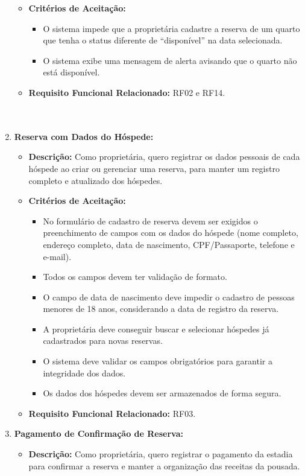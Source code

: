 \documentclass[
	12pt,				%
	openany,			%
	oneside,			%
	a4paper,			%
	english,			%
	french,				%
	spanish,			%
	brazil				%
	]{abntex2}
\begin{document}
\begin{enumerate}[label=\textbf{\arabic*.}]
\begin{itemize}
		\item \textbf{Critérios de Aceitação:}
		\begin{itemize}
			\item O sistema impede que a proprietária cadastre a reserva de um quarto que tenha o status diferente de “disponível” na data selecionada.
			\item O sistema exibe uma mensagem de alerta avisando que o quarto não está disponível.
		\end{itemize}
		\item \textbf{Requisito Funcional Relacionado:} RF02 e RF14.
		\\
		\\
		\\
	\end{itemize} 
	\item \textbf{Reserva com Dados do Hóspede:}
	\begin{itemize}
		\item \textbf{Descrição:} Como proprietária, quero registrar os dados pessoais de cada hóspede ao criar ou gerenciar uma reserva, para manter um registro completo e atualizado dos hóspedes.
		\item \textbf{Critérios de Aceitação:}
		\begin{itemize}
			\item No formulário de cadastro de reserva devem ser exigidos o preenchimento de campos com os dados do hóspede (nome completo, endereço completo, data de nascimento, CPF/Passaporte, telefone e e-mail).
			\item Todos os campos devem ter validação de formato.
			\item O campo de data de nascimento deve impedir o cadastro de pessoas menores de 18 anos, considerando a data de registro da reserva.
			\item A proprietária deve conseguir buscar e selecionar hóspedes já cadastrados para novas reservas.
			\item O sistema deve validar os campos obrigatórios para garantir a integridade dos dados.
			\item Os dados dos hóspedes devem ser armazenados de forma segura.
		\end{itemize}
		\item \textbf{Requisito Funcional Relacionado:} RF03.
	\end{itemize} 
	\item \textbf{Pagamento de Confirmação de Reserva:}
	\begin{itemize}
		\item \textbf{Descrição:} Como proprietária, quero registrar o pagamento  da estadia para confirmar a reserva e manter a organização das receitas da pousada.

\end{itemize}
\end{enumerate}
\end{document}
